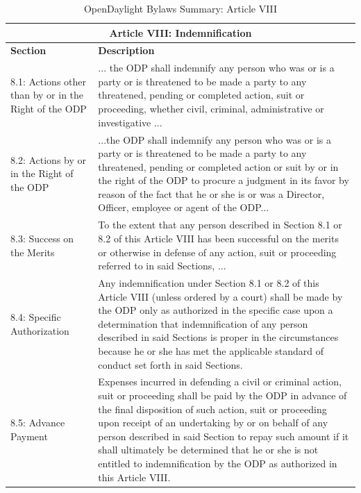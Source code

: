 \documentclass[a4paper, 12pt]{book}
\begin{document}
{\begin{table}[H]
  \begin{center}
    \begin{tabular}{ | p{4cm} | p{11cm} | }
    \toprule
    \multicolumn {2}{|c|}{\textbf{Article VIII: Indemnification}} \\
    \hline
    \textbf{Section} & \textbf{Description} \\
    \hline
    8.1: Actions other than by or in the Right of the ODP & ... the ODP shall indemnify any person who was or is a party or is threatened to be made a party to any threatened, pending or completed action, suit or proceeding, whether civil, criminal, administrative or investigative ...\\
    \hline
    8.2: Actions by or in the Right of the ODP & ...the ODP shall indemnify any person who was or is a party or is threatened to be made a party to any threatened, pending or completed action or suit by or in the right of the ODP to procure a judgment in its favor by reason of the fact that he or she is or was a Director, Officer, employee or agent of the ODP...\\
    \hline
    8.3: Success on the Merits & To the extent that any person described in Section 8.1 or 8.2 of this Article VIII has been successful on the merits or otherwise in defense of any action, suit or proceeding referred to in said Sections, ...\\
    \hline
    8.4: Specific Authorization & Any indemnification under Section 8.1 or 8.2 of this Article VIII (unless ordered by a court) shall be made by the ODP only as authorized in the specific case upon a determination that indemnification of any person described in said Sections is proper in the circumstances because he or she has met the applicable standard of conduct set forth in said Sections.\\
    \hline
    8.5: Advance Payment & Expenses incurred in defending a civil or criminal action, suit or proceeding shall be paid by the ODP in advance of the final disposition of such action, suit or proceeding upon receipt of an undertaking by or on behalf of any person described in said Section to repay such amount if it shall ultimately be determined that he or she is not entitled to indemnification by the ODP as authorized in this Article VIII.\\
    \bottomrule
    \end{tabular}
    \caption{OpenDaylight Bylaws Summary: Article VIII}
    \label{tab:odlbylaws-art08}
  \end{center}
\end{table}

}
\end{document}
